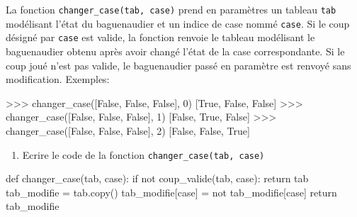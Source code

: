 \medskip

La fonction \verb|changer_case(tab, case)| prend en paramètres un tableau \texttt{tab} modélisant l'état du baguenaudier et un indice de case nommé \texttt{case}. Si le coup désigné par \texttt{case} est valide, la fonction renvoie le tableau modélisant le baguenaudier obtenu après avoir changé l'état de la case correspondante. Si le coup joué n'est pas valide, le baguenaudier passé en paramètre est renvoyé sans modification. 
Exemples:

\begin{CodePythontexAlt}[TaillePolice=\large, Largeur=1\linewidth,Centre,Lignes=true,PremLigne=1]{}
>>> changer_case([False, False, False], 0)
[True, False, False]
>>> changer_case([False, False, False], 1)
[False, True, False]
>>> changer_case([False, False, False], 2)
[False, False, True]
    
\end{CodePythontexAlt}
\begin{enumerate}[resume]
\item Ecrire le code de la fonction \verb|changer_case(tab, case)|
\end{enumerate}

\begin{blocvisible}[height=6]
    \begin{CodePythontexAlt}[TaillePolice=\large, Largeur=1\linewidth,Centre,Lignes=true,PremLigne=1]{}
    def changer_case(tab, case):
        if not coup_valide(tab, case):
            return tab
        tab_modifie = tab.copy()
        tab_modifie[case] = not tab_modifie[case]
        return tab_modifie
    \end{CodePythontexAlt}
\end{blocvisible}

\pagebreak



